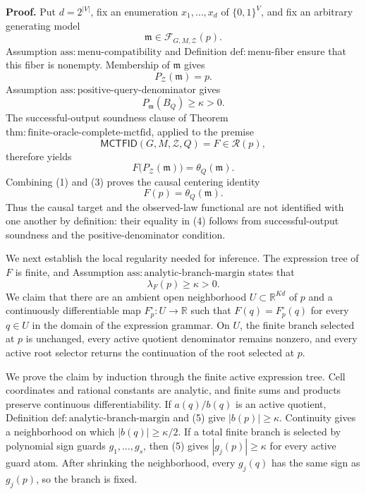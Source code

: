 \textbf{Proof.}
Put \(d=2^{|V|}\), fix an enumeration \(x_1,\ldots,x_d\) of \(\{0,1\}^{V}\), and fix an arbitrary generating model
\[
 \mathfrak m\in\mathcal F_{G,M,\mathcal Z}(p).
\]
Assumption \(\mathrm{ass:menu\text{-}compatibility}\) and Definition \(\mathrm{def:menu\text{-}fiber}\) ensure that this fiber is nonempty.  Membership of \(\mathfrak m\) gives
\[
 P_{\mathcal Z}(\mathfrak m)=p. \tag{1}
\]
Assumption \(\mathrm{ass:positive\text{-}query\text{-}denominator}\) gives
\[
 P_{\mathfrak m}(B_Q)\geq\kappa>0. \tag{2}
\]
The successful-output soundness clause of Theorem \(\mathrm{thm:finite\text{-}oracle\text{-}complete\text{-}mctfid}\), applied to the premise
\[
 \mathsf{MCTFID}(G,M,\mathcal Z,Q)=F\in\mathcal R(p),
\]
therefore yields
\[
 F\bigl(P_{\mathcal Z}(\mathfrak m)\bigr)=\theta_Q(\mathfrak m). \tag{3}
\]
Combining (1) and (3) proves the causal centering identity
\[
 F(p)=\theta_Q(\mathfrak m). \tag{4}
\]
Thus the causal target and the observed-law functional are not identified with one another by definition: their equality in (4) follows from successful-output soundness and the positive-denominator condition.

We next establish the local regularity needed for inference.  The expression tree of \(F\) is finite, and Assumption \(\mathrm{ass:analytic\text{-}branch\text{-}margin}\) states that
\[
 \lambda_F(p)\geq\kappa>0. \tag{5}
\]
We claim that there are an ambient open neighborhood \(U\subset\mathbb R^{Kd}\) of \(p\) and a continuously differentiable map \(F_p^{\circ}:U\to\mathbb R\) such that \(F(q)=F_p^{\circ}(q)\) for every \(q\in U\) in the domain of the expression grammar.  On \(U\), the finite branch selected at \(p\) is unchanged, every active quotient denominator remains nonzero, and every active root selector returns the continuation of the root selected at \(p\).

We prove the claim by induction through the finite active expression tree.  Cell coordinates and rational constants are analytic, and finite sums and products preserve continuous differentiability.  If \(a(q)/b(q)\) is an active quotient, Definition \(\mathrm{def:analytic\text{-}branch\text{-}margin}\) and (5) give \(|b(p)|\geq\kappa\).  Continuity gives a neighborhood on which \(|b(q)|\geq\kappa/2\).  If a total finite branch is selected by polynomial sign guards \(g_1,\ldots,g_s\), then (5) gives \(|g_j(p)|\geq\kappa\) for every active guard atom.  After shrinking the neighborhood, every \(g_j(q)\) has the same sign as \(g_j(p)\), so the branch is fixed.

